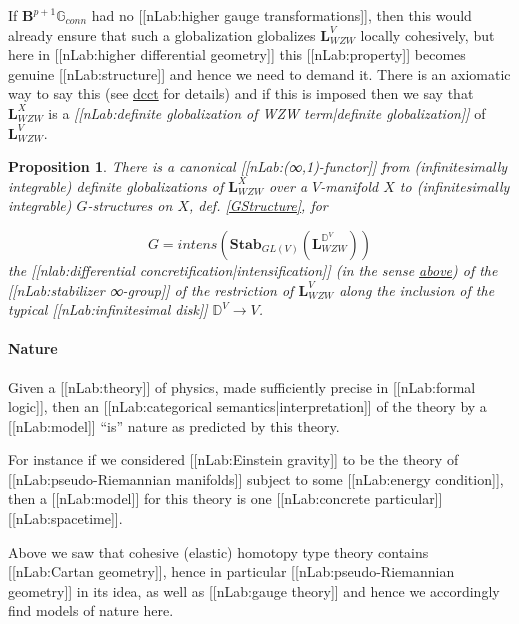 \documentclass[12pt,titlepage]{article}
\theoremstyle{plain}
\newtheorem{prop}{Proposition}
\theoremstyle{definition}
\theoremstyle{remark}
\begin{document}
If $\mathbf{B}^{p+1}\mathbb{G}_{conn}$ had no [[nLab:higher gauge transformations]], then this would already ensure that such a globalization globalizes $\mathbf{L}_{WZW}^V$ locally cohesively, but here in [[nLab:higher differential geometry]] this [[nLab:property]] becomes genuine [[nLab:structure]] and hence we need to demand it. There is an axiomatic way to say this (see \hyperlink{dcct}{dcct} for details) and if this is imposed then we say that $\mathbf{L}_{WZW}^X$ is a \emph{[[nLab:definite globalization of WZW term|definite globalization]]} of $\mathbf{L}_{WZW}^V$.

\begin{prop}
\label{DefiniteGlobalizationsToGStructure}\hypertarget{DefiniteGlobalizationsToGStructure}{}
There is a canonical [[nLab:(∞,1)-functor]] from (infinitesimally integrable) definite globalizations of $\mathbf{L}_{WZW}^X$ over a $V$-manifold $X$ to (infinitesimally integrable) $G$-structures on $X$, def. \ref{GStructure}, for

\begin{displaymath}
G = intens(\mathbf{Stab}_{GL(V)}(\mathbf{L}_{WZW}^{\mathbb{D}^V}))
\end{displaymath}
the [[nlab:differential concretification|intensification]] (in the sense \hyperlink{IntensiveExtensive}{above}) of the [[nLab:stabilizer ∞-group]] of the restriction of $\mathbf{L}_{WZW}^V$ along the inclusion of the typical [[nLab:infinitesimal disk]] $\mathbb{D}^V \to V$.

\end{prop}
\hypertarget{nature}{}\paragraph*{{Nature}}\label{nature}

Given a [[nLab:theory]] of physics, made sufficiently precise in [[nLab:formal logic]], then an [[nLab:categorical semantics|interpretation]] of the theory by a [[nLab:model]] ``is'' nature as predicted by this theory.

For instance if we considered [[nLab:Einstein gravity]] to be the theory of [[nLab:pseudo-Riemannian manifolds]] subject to some [[nLab:energy condition]], then a [[nLab:model]] for this theory is one [[nLab:concrete particular]] [[nLab:spacetime]].

Above we saw that cohesive (elastic) homotopy type theory contains [[nLab:Cartan geometry]], hence in particular [[nLab:pseudo-Riemannian geometry]] in its idea, as well as [[nLab:gauge theory]] and hence we accordingly find models of nature here.
\end{document}
